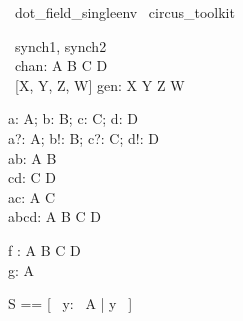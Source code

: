 \begin{zsection}
  \SECTION\ dot\_field\_singleenv \parents\ circus\_toolkit
\end{zsection}

\begin{zed}
   [A, B, C, D]
\end{zed}

\begin{circus}
  \circchannel\  synch1, synch2 \\
   \circchannel\ chan: A \cross B \cross C \cross D \\ %
   \circchannel\ [X, Y, Z, W] gen: X \cross Y \cross Z \cross W
\end{circus}

\begin{axdef}
   a: A; b: B; c: C; d: D \\
   a?: A; b!: B; c?: C; d!: D \\
   ab: A \cross B \\
   cd: C \cross D \\
   ac: A \cross C \\
   abcd: A \cross B \cross C \cross D
\end{axdef}

\begin{axdef}
   f : A \fun B \cross C \cross D \\
   g: A \inj \nat
\end{axdef}

\begin{zed}
   S == [~ y: \power~A | y \neq \emptyset ~]
\end{zed}

